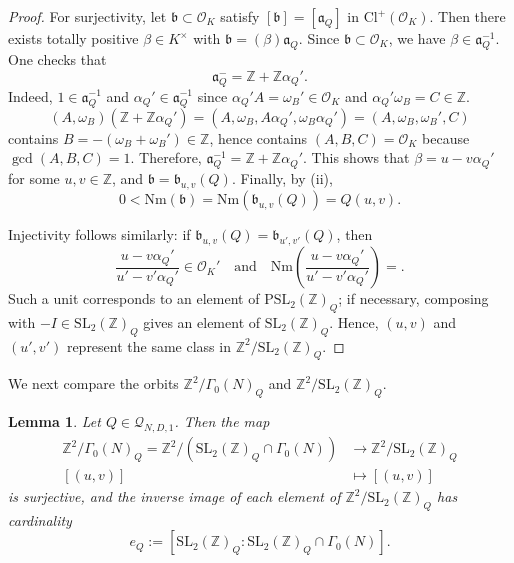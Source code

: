 \documentclass[12pt]{amsart}
\numberwithin{equation}{section}
\newtheorem{lemma}[theorem]{Lemma}
\theoremstyle{definition}
\begin{document}
\begin{proof}
For surjectivity, let $\mathfrak{b}\subset\mathcal{O}_{K}$ satisfy $[\mathfrak{b}]=[\mathfrak{a}_{Q}]$ in $\mathrm{Cl}^{+}(\mathcal{O}_{K})$.
Then there exists totally positive $\beta\in K^{\times}$ with $\mathfrak{b}=(\beta)\mathfrak{a}_{Q}$.
Since $\mathfrak{b}\subset\mathcal{O}_{K}$, we have $\beta\in\mathfrak{a}_{Q}^{-1}$.
One checks that
$$\mathfrak{a}_{Q}^{-}=\mathbb{Z}+\mathbb{Z}\alpha_{Q}'.$$
Indeed, $1\in\mathfrak{a}_{Q}^{-1}$ and $\alpha_{Q}'\in\mathfrak{a}_{Q}^{-1}$ since $\alpha_Q'A=\omega_{B}'\in\mathcal{O}_{K}$ and $\alpha_Q'\omega_B=C\in\mathbb{Z}$.
$$(A,\omega_{B})(\mathbb{Z}+\mathbb{Z}\alpha_{Q}')=(A,\omega_{B},A\alpha_{Q}',\omega_{B}\alpha_{Q}')=(A,\omega_{B},\omega_{B}',C)$$
contains $B=-(\omega_{B}+\omega_{B}')\in\mathbb{Z}$, hence contains $(A,B,C)=\mathcal{O}_{K}$ because $\gcd(A,B,C)=1$.
Therefore, $\mathfrak{a}_{Q}^{-1}=\mathbb{Z}+\mathbb{Z}\alpha_{Q}'$. This shows that $\beta=u-v\alpha_{Q}'$ for some $u,v\in\mathbb{Z}$, and $\mathfrak{b}=\mathfrak{b}_{u,v}(Q)$.
Finally, by (ii), 
$$0<\mathrm{Nm}(\mathfrak b)=\mathrm{Nm}(\mathfrak{b}_{u,v}(Q))=Q(u,v).$$

Injectivity follows similarly: if $\mathfrak b_{u,v}(Q)=\mathfrak b_{u',v'}(Q)$, then
$$\frac{u-v\alpha_{Q}'}{u'-v'\alpha_{Q}'}\in\mathcal{O}_{K}'\quad\text{and}\quad\mathrm{Nm}\left(\frac{u-v\alpha_{Q}'}{u'-v'\alpha_{Q}'}\right)=.$$
Such a unit corresponds to an element of $\mathrm{PSL}_{2}(\mathbb{Z})_{Q}$; if necessary, composing with $-I\in\mathrm{SL}_{2}(\mathbb{Z})_{Q}$ gives an element of $\mathrm{SL}_2(\mathbb{Z})_{Q}$.
Hence, $(u,v)$ and $(u',v')$ represent the same class in $\mathbb{Z}^{2}/\mathrm{SL}_{2}(\mathbb{Z})_{Q}$.
\end{proof}

We next compare the orbits $\mathbb{Z}^{2}/\Gamma_{0}(N)_{Q}$ and $\mathbb{Z}^{2}/\mathrm{SL}_2(\mathbb{Z})_{Q}$.

\begin{lemma}\label{lem-stabilizer}
    Let $Q\in\mathcal{Q}_{N,D,1}$. Then the map
    \begin{align*}
        \mathbb{Z}^{2}/\Gamma_{0}(N)_{Q}=\mathbb{Z}^{2}/(\mathrm{SL}_{2}(\mathbb{Z})_{Q}\cap\Gamma_{0}(N))&\rightarrow\mathbb{Z}^{2}/\mathrm{SL}_{2}(\mathbb{Z})_{Q}\\
        [(u,v)]&\mapsto[(u,v)]
    \end{align*}
    is surjective, and the inverse image of each element of $\mathbb{Z}^{2}/\mathrm{SL}_{2}(\mathbb{Z})_{Q}$ has cardinality
    $$e_{Q}:=[\mathrm{SL}_{2}(\mathbb{Z})_{Q}:\mathrm{SL}_{2}(\mathbb{Z})_{Q}\cap\Gamma_{0}(N)].$$
\end{lemma}
\end{document}
